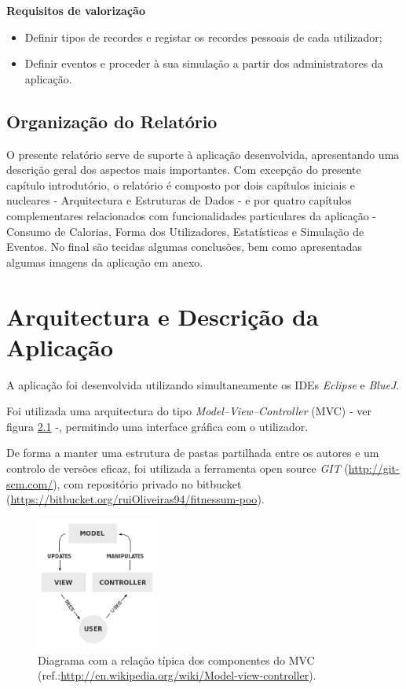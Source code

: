 \documentclass[a4paper,10pt]{report}
\begin{document}
\textbf{Requisitos de valorização}
\begin{itemize}
\item Definir tipos de recordes e registar os recordes pessoais de cada utilizador;
\item Definir eventos e proceder à sua simulação a partir dos administratores da aplicação.
\end{itemize}

\section{Organização do Relatório}
\label{sec:org}
O presente relatório serve de suporte à aplicação desenvolvida, apresentando uma descrição geral dos aspectos mais importantes.
Com excepção do presente capítulo introdutório, o relatório é composto por dois capítulos iniciais e nucleares  - Arquitectura e 
Estruturas de Dados - e por quatro capítulos complementares relacionados com funcionalidades particulares da aplicação - Consumo de Calorias, 
Forma dos Utilizadores, Estatísticas e Simulação de Eventos. No final são tecidas algumas conclusões, bem como apresentadas algumas imagens da
aplicação em anexo.

\chapter{Arquitectura e Descrição da Aplicação}
\label{cap:arq}

A aplicação foi desenvolvida utilizando simultaneamente os IDEs \emph{Eclipse} e \emph{BlueJ}.

Foi utilizada uma arquitectura do tipo \emph{Model–View–Controller} (MVC) - ver figura \ref{fig:mvc} -, 
permitindo uma interface gráfica com o utilizador.

De forma a manter uma estrutura de pastas partilhada entre os autores e um controlo de versões eficaz, 
foi utilizada a ferramenta open source \emph{GIT} (\url{http://git-scm.com/}), 
com repositório privado no bitbucket (\url{https://bitbucket.org/ruiOliveiras94/fitnessum-poo}).

\begin{figure}
\centering
\includegraphics[width=4cm]{MVC-Process.png}
\caption{Diagrama com a relação típica dos componentes do MVC (ref.:\url{http://en.wikipedia.org/wiki/Model-view-controller}).}
\label{fig:mvc}
\end{figure}
\end{document}
